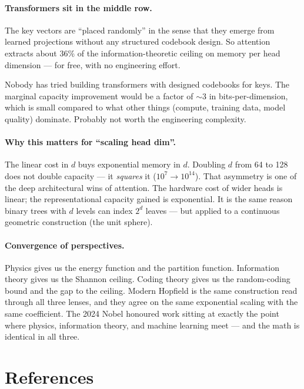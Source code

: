 \documentclass[11pt,a4paper]{article}
\begin{document}
\paragraph{Transformers sit in the middle row.} The key vectors are
``placed randomly'' in the sense that they emerge from learned
projections without any structured codebook design. So attention
extracts about 36\% of the information-theoretic ceiling on memory per
head dimension --- for free, with no engineering effort.

Nobody has tried building transformers with designed codebooks for
keys. The marginal capacity improvement would be a factor of $\sim 3$
in bits-per-dimension, which is small compared to what other things
(compute, training data, model quality) dominate. Probably not worth
the engineering complexity.

\paragraph{Why this matters for ``scaling head dim''.} The linear cost
in $d$ buys exponential memory in $d$. Doubling $d$ from 64 to 128
does not double capacity --- it \emph{squares} it
($10^7 \to 10^{14}$). That asymmetry is one of the deep architectural
wins of attention. The hardware cost of wider heads is linear; the
representational capacity gained is exponential. It is the same reason
binary trees with $d$ levels can index $2^d$ leaves --- but applied to a
continuous geometric construction (the unit sphere).

\paragraph{Convergence of perspectives.} Physics gives us the energy
function and the partition function. Information theory gives us the
Shannon ceiling. Coding theory gives us the random-coding bound and the
gap to the ceiling. Modern Hopfield is the same construction read
through all three lenses, and they agree on the same exponential
scaling with the same coefficient. The 2024 Nobel honoured work
sitting at exactly the point where physics, information theory, and
machine learning meet --- and the math is identical in all three.

\section{References}
\end{document}
